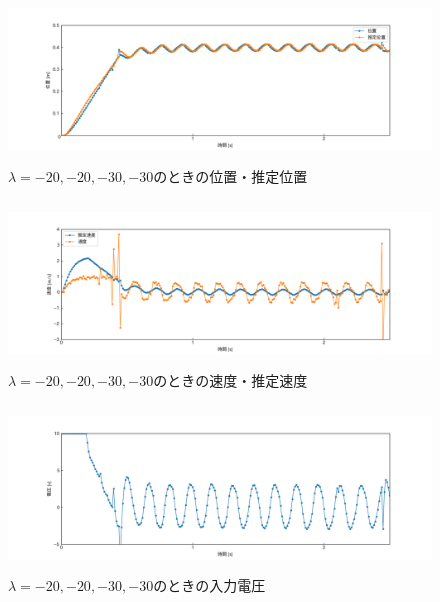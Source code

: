 \documentclass[12pt]{jsarticle}
\begin{document}
\begin{figure}[H]
  \begin{center}
    \includegraphics[clip,width=13.0cm, height=4.4cm]{../img/Exp13-1.png}
    \caption{$\lambda=-20, -20, -30, -30$のときの位置・推定位置}
    \label{Exp13-1}
  \end{center}
\end{figure}
\begin{figure}[H]
  \begin{center}
    \includegraphics[clip,width=13.0cm, height=4.4cm]{../img/Exp13-2.png}
    \caption{$\lambda=-20, -20, -30, -30$のときの速度・推定速度}
    \label{Exp13-2}
  \end{center}
\end{figure}
\begin{figure}[H]
  \begin{center}
    \includegraphics[clip,width=13.0cm, height=4.4cm]{../img/Exp13-3.png}
    \caption{$\lambda=-20, -20, -30, -30$のときの入力電圧}
    \label{Exp13-3}
  \end{center}
\end{figure}
\end{document}
